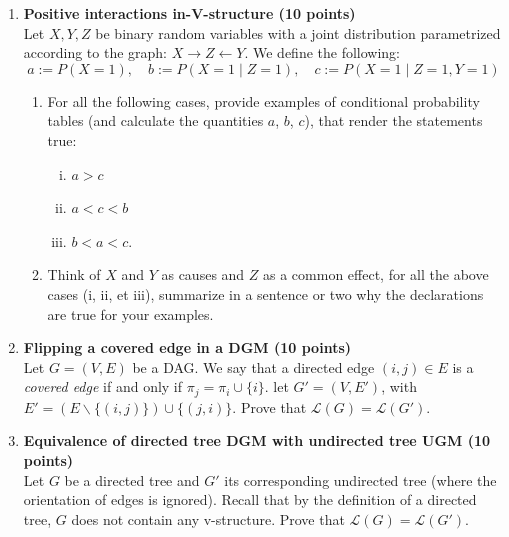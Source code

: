 \documentclass[12pt]{article}
\newcommand{\1}{{\bf 1}}
\begin{document}
\begin{enumerate}
\vspace{5mm}
\item {\bf Positive interactions in-V-structure (10 points) } \\
Let $X, Y, Z$ be binary random variables with a joint
distribution parametrized according to the graph: $X \rightarrow Z
\leftarrow Y$. We define the following: 
\begin{equation}
a := P(X = 1), \quad b := P (X = 1 \mid Z = 1), \quad  c := P (X = 1 \mid Z
= 1, Y = 1) \nonumber
\end{equation}
\begin{enumerate}
\item For all the following cases, provide examples of conditional
probability tables (and calculate the quantities $a$, $b$, $c$),
that render the statements true: 
\begin{enumerate}[(i)]
\item $a> c$
\item $a <c <b$
\item $b <a <c$.
\end{enumerate}
\item Think of $X$ and $Y$ as causes and $Z$ as a common effect, for all
  the above cases (i, ii, et iii), summarize in a sentence or two why the
  declarations are true for your examples.
\end{enumerate}

\item {\bf Flipping a covered edge in a DGM (10 points) } \\
Let $G=(V,E)$ be a DAG. We say that a directed edge $(i,j) \in E$ is a \emph{covered edge} if and only if $\pi_j=\pi_i \cup \{i\}$.
let $G'=(V,E')$, with $E'= ( E\backslash \{ (i,j)\} )\cup \{ (j,i)\}$. Prove that $\mathcal{L}(G)=\mathcal{L}(G')$.

\vspace{0.2cm}

\item {\bf Equivalence of directed tree DGM with undirected tree UGM (10 points) } \\
Let $G$ be a directed tree and $G'$ its corresponding undirected tree (where the orientation of edges is ignored). Recall that by the definition of a directed tree, $G$ does not contain any v-structure. Prove that $\mathcal{L}(G)=\mathcal{L}(G')$.


\end{enumerate}
\end{document}
